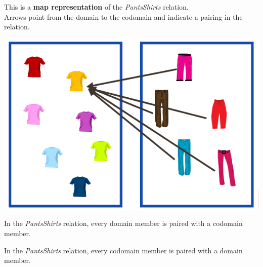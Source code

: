 \documentclass{ximera}
\author{Lee Wayand}
\begin{document}
\begin{exercise}

This is a \textbf{map representation} of the \textit{PantsShirts} relation. \\


Arrows point from the domain to the codomain and indicate a pairing in the relation.


\begin{image}
\includegraphics{../../pics/func_maps/f_17.png}
\end{image}




\begin{question} 
In the \textit{PantsShirts} relation, every domain member is paired with a codomain member.

\begin{multipleChoice}
\end{multipleChoice}
\end{question}







\begin{question} 
In the \textit{PantsShirts} relation, every codomain member is paired with a domain member.

\begin{multipleChoice}
\end{multipleChoice}
\end{question}








\end{exercise}
\end{document}
